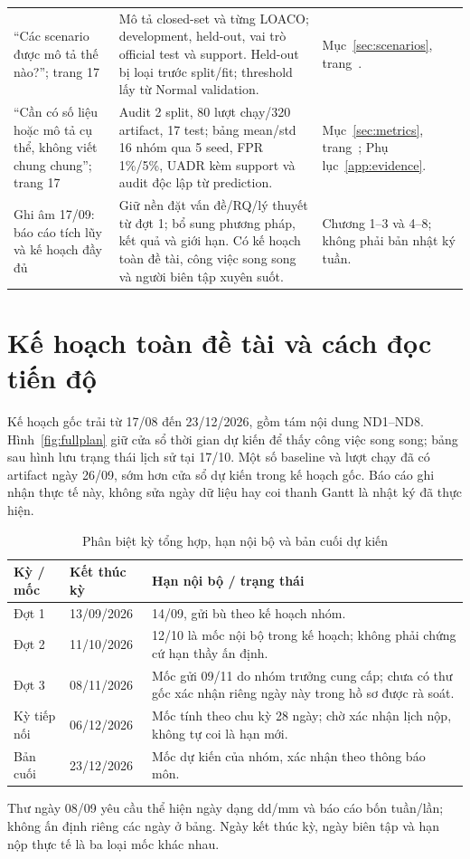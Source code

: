 \documentclass[12pt,a4paper,oneside]{report}
\begin{document}
\begin{longtable}{L{3.4cm}L{8.2cm}L{4.1cm}}
``Các scenario được mô tả thế nào?''; trang 17 & Mô tả closed-set và từng LOACO; development, held-out, vai trò official test và support. Held-out bị loại trước split/fit; threshold lấy từ Normal validation. & Mục~\ref{sec:scenarios}, trang~\pageref{sec:scenarios}.\\
``Cần có số liệu hoặc mô tả cụ thể, không viết chung chung''; trang 17 & Audit 2 split, 80 lượt chạy/320 artifact, 17 test; bảng mean/std 16 nhóm qua 5 seed, FPR 1\%/5\%, UADR kèm support và audit độc lập từ prediction. & Mục~\ref{sec:metrics}, trang~\pageref{sec:metrics}; Phụ lục~\ref{app:evidence}.\\
Ghi âm 17/09: báo cáo tích lũy và kế hoạch đầy đủ & Giữ nền đặt vấn đề/RQ/lý thuyết từ đợt 1; bổ sung phương pháp, kết quả và giới hạn. Có kế hoạch toàn đề tài, công việc song song và người biên tập xuyên suốt. & Chương 1--3 và 4--8; không phải bản nhật ký tuần.\\
\bottomrule\end{longtable}\endgroup

\section{Kế hoạch toàn đề tài và cách đọc tiến độ}\label{sec:progress}
Kế hoạch gốc trải từ 17/08 đến 23/12/2026, gồm tám nội dung ND1--ND8. Hình~\ref{fig:fullplan} giữ cửa sổ thời gian dự kiến để thấy công việc song song; bảng sau hình lưu trạng thái lịch sử tại 17/10. Một số baseline và lượt chạy đã có artifact ngày 26/09, sớm hơn cửa sổ dự kiến trong kế hoạch gốc. Báo cáo ghi nhận thực tế này, không sửa ngày dữ liệu hay coi thanh Gantt là nhật ký đã thực hiện.



\begin{table}[H]\centering\small
\caption{Phân biệt kỳ tổng hợp, hạn nội bộ và bản cuối dự kiến}
\begin{tabularx}{\textwidth}{L{2.0cm}L{3.8cm}Y}\toprule
Kỳ / mốc & Kết thúc kỳ & Hạn nội bộ / trạng thái\\\midrule
Đợt 1 & 13/09/2026 & 14/09, gửi bù theo kế hoạch nhóm.\\
Đợt 2 & 11/10/2026 & 12/10 là mốc nội bộ trong kế hoạch; không phải chứng cứ hạn thầy ấn định.\\
Đợt 3 & 08/11/2026 & Mốc gửi 09/11 do nhóm trưởng cung cấp; chưa có thư gốc xác nhận riêng ngày này trong hồ sơ được rà soát.\\
Kỳ tiếp nối & 06/12/2026 & Mốc tính theo chu kỳ 28 ngày; chờ xác nhận lịch nộp, không tự coi là hạn mới.\\
Bản cuối & 23/12/2026 & Mốc dự kiến của nhóm, xác nhận theo thông báo môn.\\
\bottomrule\end{tabularx}\end{table}
Thư ngày 08/09 yêu cầu thể hiện ngày dạng dd/mm và báo cáo bốn tuần/lần; không ấn định riêng các ngày ở bảng. Ngày kết thúc kỳ, ngày biên tập và hạn nộp thực tế là ba loại mốc khác nhau.
\end{document}
